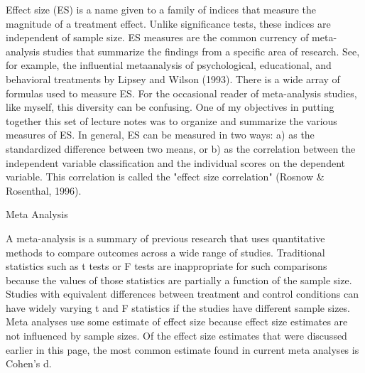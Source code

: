 Effect size (ES) is a name given to a family of indices that measure the magnitude of
a treatment effect. Unlike significance tests, these indices are independent of sample
size. ES measures are the common currency of meta-analysis studies that summarize
the findings from a specific area of research. See, for example, the influential metaanalysis
of psychological, educational, and behavioral treatments by Lipsey and
Wilson (1993).
There is a wide array of formulas used to measure ES. For the occasional reader of
meta-analysis studies, like myself, this diversity can be confusing. One of my
objectives in putting together this set of lecture notes was to organize and summarize
the various measures of ES.
In general, ES can be measured in two ways:
a) as the standardized difference between two means, or
b) as the correlation between the independent variable classification and the
individual scores on the dependent variable. This correlation is called the "effect size
correlation" (Rosnow & Rosenthal, 1996).

Meta Analysis

A meta-analysis is a summary of previous research that uses quantitative methods to
compare outcomes across a wide range of studies. Traditional statistics such as t tests
or F tests are inappropriate for such comparisons because the values of those
statistics are partially a function of the sample size. Studies with equivalent
differences between treatment and control conditions can have widely varying t and
F statistics if the studies have different sample sizes. Meta analyses use some
estimate of effect size because effect size estimates are not influenced by sample
sizes. Of the effect size estimates that were discussed earlier in this page, the most
common estimate found in current meta analyses is Cohen's d.
